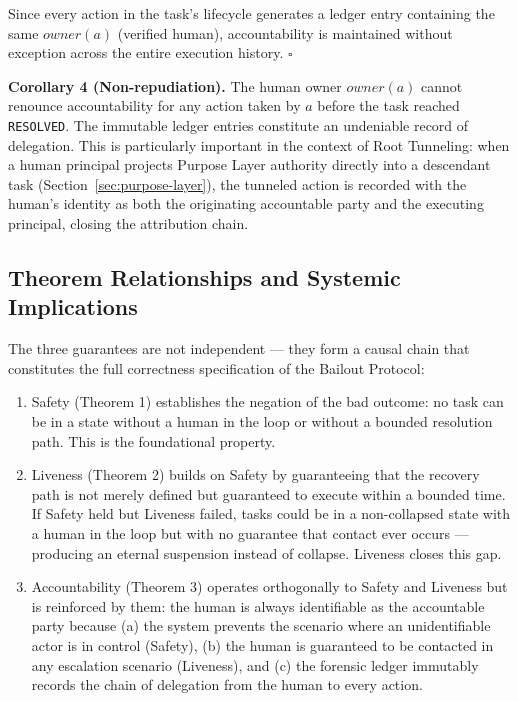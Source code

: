 Since every action in the task's lifecycle generates a ledger entry containing the same $owner(a)$ (verified human), accountability is maintained without exception across the entire execution history. $\square$

\bigskip
\noindent\textbf{Corollary 4 (Non-repudiation).} The human owner $owner(a)$ cannot renounce accountability for any action taken by $a$ before the task reached \texttt{RESOLVED}. The immutable ledger entries constitute an undeniable record of delegation. This is particularly important in the context of Root Tunneling: when a human principal projects Purpose Layer authority directly into a descendant task (Section~\ref{sec:purpose-layer}), the tunneled action is recorded with the human's identity as both the originating accountable party and the executing principal, closing the attribution chain.

\subsection{Theorem Relationships and Systemic Implications}

The three guarantees are not independent — they form a causal chain that constitutes the full correctness specification of the Bailout Protocol:

\begin{enumerate}
\item Safety (Theorem 1) establishes the negation of the bad outcome: no task can be in a state without a human in the loop or without a bounded resolution path. This is the foundational property.

\item Liveness (Theorem 2) builds on Safety by guaranteeing that the recovery path is not merely defined but guaranteed to execute within a bounded time. If Safety held but Liveness failed, tasks could be in a non-collapsed state with a human in the loop but with no guarantee that contact ever occurs — producing an eternal suspension instead of collapse. Liveness closes this gap.

\item Accountability (Theorem 3) operates orthogonally to Safety and Liveness but is reinforced by them: the human is always identifiable as the accountable party because (a) the system prevents the scenario where an unidentifiable actor is in control (Safety), (b) the human is guaranteed to be contacted in any escalation scenario (Liveness), and (c) the forensic ledger immutably records the chain of delegation from the human to every action.
\end{enumerate}

